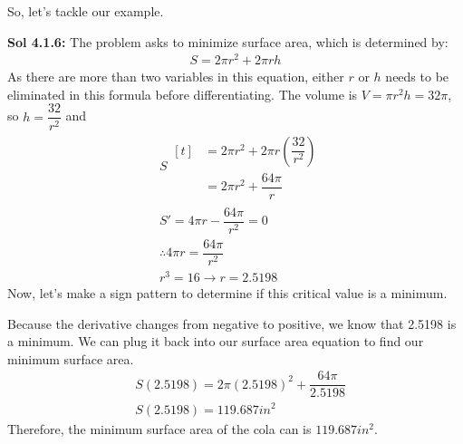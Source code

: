 So, let's tackle our example. \par

\begin{tcolorbox}[solution]
    \textbf{Sol 4.1.6: } The problem asks to minimize surface area, which is determined by: \begin{align*}
        S = 2\pi r^2 + 2\pi rh 
    \end{align*}
    As there are more than two variables in this equation, either $r$ or $h$ needs to be eliminated in this formula before differentiating. The volume is $V = \pi r^2h = 32\pi$, so $h = \dfrac{32}{r^2}$ and \begin{align*}
        & S \begin{aligned}[t]
            & = 2\pi r^2 + 2\pi r\left(\dfrac{32}{r^2}\right) \\[11pt]
            & = 2\pi r^2 + \dfrac{64\pi}{r}
        \end{aligned} \\[11pt]
        & S' = 4\pi r - \dfrac{64\pi}{r^2} = 0 \\[11pt]
        & \therefore 4\pi r = \dfrac{64\pi}{r^2} \\[11pt]
        & r^3 = 16 \rightarrow r = 2.5198
    \end{align*}
    Now, let's make a sign pattern to determine if this critical value is a minimum. \\
    \begin{center}
    \end{center} \vspace{11pt}
    Because the derivative changes from negative to positive, we know that 2.5198 is a minimum. We can plug it back into our surface area equation to find our minimum surface area. \begin{align*}
        & S(2.5198) = 2\pi(2.5198)^2 + \dfrac{64\pi}{2.5198} \\[11pt]
        & S(2.5198) = 119.687 \si{in^2}
    \end{align*}
    Therefore, the minimum surface area of the cola can is $\boxed{119.687 \si{in^2}}$.
\end{tcolorbox} \vspace{11pt}

